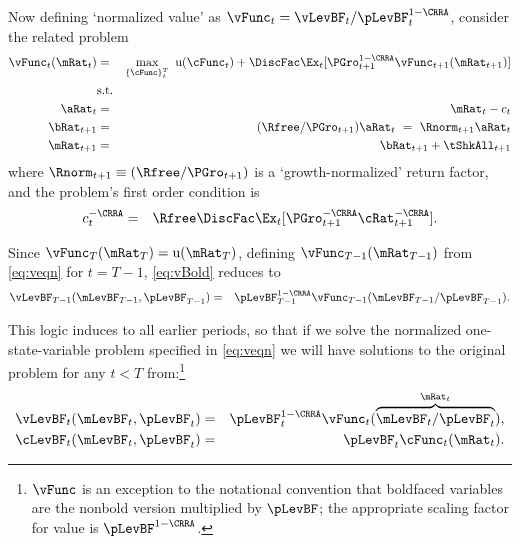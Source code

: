 \documentclass[titlepage]{\econtex}\providecommand{\texname}{BufferStockTheory}%
\providecommand{\EqDir}{Equations}
\begin{document}
\hypertarget{The-Related-Problem}{}
Now defining `normalized value' as $\vFunc_{t} = \vLevBF_{t}/\pLevBF_{t}^{1-\CRRA}$, consider the related problem %
\begin{eqnarray}
\vFunc_{t}(\mRat_{t}) & = & \max_{\{\cFunc\}_{t}^{T}}~  \util(\cFunc_{t}) +\DiscFac \Ex_{t}[\PGro_{t+1}^{1-\CRRA}\vFunc_{t+1}({\mRat}_{t+1})] \label{eq:veqn}  \\
& \mbox{s.t.} &  \notag 
 \\ {\aRat}_{t} & = & \mRat_{t}-c_{t}  \label{eq:smalls} \notag
 \\ {\bRat}_{t+1} & = & (\Rfree/\PGro_{t+1})\aRat_{t}  ~ = ~ \Rnorm_{t+1}\aRat_{t}  \notag \label{eq:smallb}
\\ \mRat_{t+1} & = & \bRat_{t+1}+\tShkAll_{t+1}  \notag %
\end{eqnarray}
where $\Rnorm_{t+1}\equiv (\Rfree/\PGro_{t+1})$ is a `growth-normalized' return factor, and the problem's first order condition is
\begin{eqnarray}
c_{t}^{-\CRRA} & = & \Rfree \DiscFac \Ex_{t}[ {\PGro}_{t+1}^{-\CRRA} {\cRat}
_{t+1}^{-\CRRA}].  \label{eq:scaledeuler}
\end{eqnarray}

Since $\vFunc_{T}(\mRat_{T}) = \util(\mRat_{T})$, defining $\vFunc_{T-1}(\mRat_{T-1})$ from \eqref{eq:veqn} for $t=T-1$, \eqref{eq:vBold} reduces to
\begin{eqnarray*}
\vLevBF_{T-1}(\mLevBF_{T-1},\pLevBF_{T-1}) & = & \pLevBF_{T-1}^{1-\CRRA} \vFunc_{T-1}(\mLevBF_{T-1}/\pLevBF_{T-1}).
\end{eqnarray*}

This logic induces to all earlier periods, so that if we solve the
normalized one-state-variable problem specified in \eqref{eq:veqn} we
will have solutions to the original problem for any $t<T$
from:\footnote{$\vFunc$ is an exception to the notational convention
  that boldfaced variables are the nonbold version multiplied by
  $\pLevBF$; the appropriate scaling factor for value is
  $\pLevBF^{1-\CRRA}$.}
\begin{eqnarray*}
   \vLevBF_{t}(\mLevBF_{t},\pLevBF_{t}) & = & \pLevBF_{t}^{1-\CRRA}\vFunc_{t}(\overbrace{\mLevBF_{t}/\pLevBF_{t}}^{\mRat_{t}}),
\\ \cLevBF_{t}(\mLevBF_{t},\pLevBF_{t}) & = & \pLevBF_{t}\cFunc_{t}(\mRat_{t}).
\end{eqnarray*}
\end{document}
